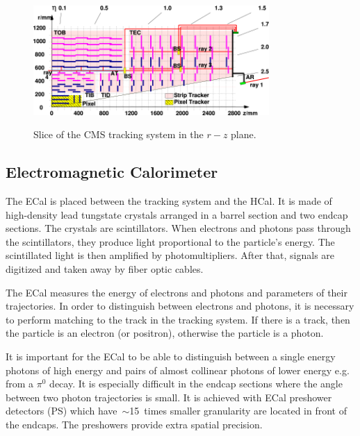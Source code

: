 \begin{figure}[htb]
  \begin{center}
    {\includegraphics[width=0.8\textwidth]{../figs/Exp/tracker_slice.png}}
    \caption{Slice of the CMS tracking system in the $r-z$ plane.}
    \label{fig:tracker_slice}
  \end{center}
\end{figure}

\subsection{Electromagnetic Calorimeter}

The ECal is placed between the tracking system and the HCal. It is made of high-density lead tungstate crystals arranged in a barrel section and two endcap sections. The crystals are scintillators. When electrons and photons pass through the scintillators, they produce light proportional to the particle's energy. The scintillated light is then amplified by photomultipliers. After that, signals are digitized and taken away by fiber optic cables.

The ECal measures the energy of electrons and photons and parameters of their trajectories. In order to distinguish between electrons and photons, it is necessary to perform matching to the track in the tracking system. If there is a track, then the particle is an electron (or positron), otherwise the particle is a photon.

It is important for the ECal to be able to distinguish between a single energy photons of high energy and pairs of almost collinear photons of lower energy e.g. from a $\pi^0$ decay. It is especially difficult in the endcap sections where the angle between two photon trajectories is small. It is achieved with ECal preshower detectors (PS) which have~$\sim$15~times smaller granularity are located in front of the endcaps. The preshowers provide extra spatial precision. 


